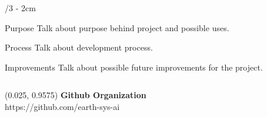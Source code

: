 \documentclass[landscape]{uioposter}
\begin{document}
\begin{frame}
\begin{columns}[onlytextwidth]
\begin{column}{\textwidth/3 - 2cm}
    \begin{block}{Purpose}
        Talk about purpose behind project and possible uses.
    \end{block}
    
     \begin{block}{Process}
        Talk about development process.
    \end{block}
    

    \begin{block}{Improvements}
        Talk about possible future improvements for the project.
    \end{block}
\end{column}


\end{columns}


\begin{textblock}{0.5}(0.025, 0.9575)
    \color{white}
    \sffamily
    \textbf{Github Organization}
    \\
    https://github.com/earth-sys-ai
\end{textblock}


\end{frame}
\end{document}

